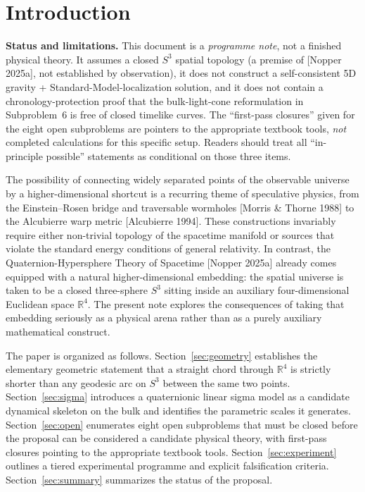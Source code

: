 \documentclass[11pt,a4paper]{article}
\begin{document}
\section{Introduction}

\textbf{Status and limitations.} This document is a \emph{programme note}, not a finished physical theory. It assumes a closed $S^3$ spatial topology (a premise of [Nopper 2025a], not established by observation), it does not construct a self-consistent 5D gravity + Standard-Model-localization solution, and it does not contain a chronology-protection proof that the bulk-light-cone reformulation in Subproblem~6 is free of closed timelike curves. The ``first-pass closures'' given for the eight open subproblems are pointers to the appropriate textbook tools, \emph{not} completed calculations for this specific setup. Readers should treat all ``in-principle possible'' statements as conditional on those three items.

\medskip

The possibility of connecting widely separated points of the observable universe by a higher-dimensional shortcut is a recurring theme of speculative physics, from the Einstein--Rosen bridge and traversable wormholes [Morris \& Thorne 1988] to the Alcubierre warp metric [Alcubierre 1994]. These constructions invariably require either non-trivial topology of the spacetime manifold or sources that violate the standard energy conditions of general relativity. In contrast, the Quaternion-Hypersphere Theory of Spacetime [Nopper 2025a] already comes equipped with a natural higher-dimensional embedding: the spatial universe is taken to be a closed three-sphere $S^3$ sitting inside an auxiliary four-dimensional Euclidean space $\mathbb{R}^4$. The present note explores the consequences of taking that embedding seriously as a physical arena rather than as a purely auxiliary mathematical construct.

The paper is organized as follows. Section~\ref{sec:geometry} establishes the elementary geometric statement that a straight chord through $\mathbb{R}^4$ is strictly shorter than any geodesic arc on $S^3$ between the same two points. Section~\ref{sec:sigma} introduces a quaternionic linear sigma model as a candidate dynamical skeleton on the bulk and identifies the parametric scales it generates. Section~\ref{sec:open} enumerates eight open subproblems that must be closed before the proposal can be considered a candidate physical theory, with first-pass closures pointing to the appropriate textbook tools. Section~\ref{sec:experiment} outlines a tiered experimental programme and explicit falsification criteria. Section~\ref{sec:summary} summarizes the status of the proposal.
\end{document}
